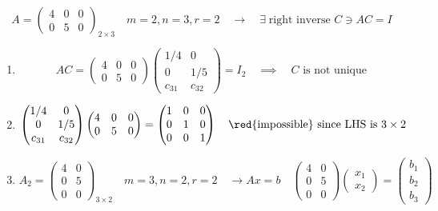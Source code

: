 \begin{eg}
    \[
        A = \begin{pmatrix}
            4 & 0 & 0 \\
            0 & 5 & 0
        \end{pmatrix}_{2 \times 3} \quad m=2, n=3, r = 2 \quad \longrightarrow \quad \exists\; \text{right inverse } C \ni AC = I
    \]
\end{eg}
\begin{enumerate}[label=$\arabic*^\circ$]
    \item \[
        AC = \begin{pmatrix}
            4 & 0 & 0 \\
            0 & 5 & 0
        \end{pmatrix} \begin{pmatrix}
            1/4 & 0 \\
            0 & 1/5 \\
            c_{31} & c_{32}
        \end{pmatrix} = I_2 \quad \implies \quad C \text{ is not unique}
    \]
    \item \[
        \begin{pmatrix}
            1/4 & 0 \\
            0 & 1/5 \\
            c_{31} & c_{32}
        \end{pmatrix} \begin{pmatrix}
            4 & 0 & 0 \\
            0 & 5 & 0
        \end{pmatrix} = \begin{pmatrix}
            1 & 0 & 0 \\
            0 & 1 & 0 \\
            0 & 0 & 1
        \end{pmatrix} \quad \text{\red{impossible} since LHS is } 3 \times 2
    \]
    \item \[
        A_2 = \begin{pmatrix}
            4 & 0 \\
            0 & 5 \\
            0 & 0
        \end{pmatrix}_{3 \times 2} \quad m=3, n=2, r=2 \quad \longrightarrow Ax = b \quad \begin{pmatrix}
            4 & 0 \\
            0 & 5 \\
            0 & 0
        \end{pmatrix} \begin{pmatrix}
            x_1 \\ x_2
        \end{pmatrix} = \begin{pmatrix}
            b_1 \\ b_2 \\ b_3
        \end{pmatrix}
    \]
\end{enumerate}

